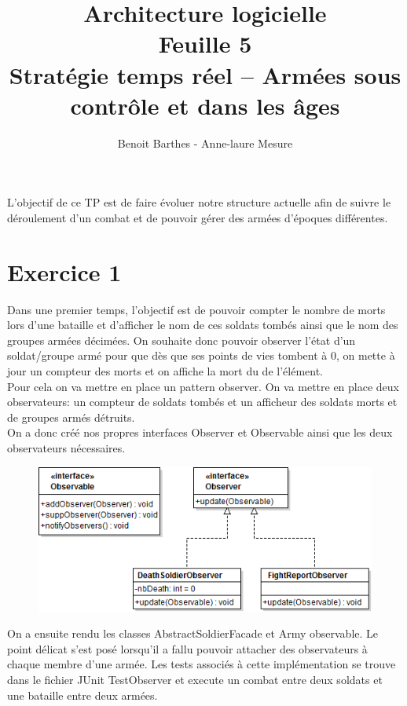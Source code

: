 \documentclass[%
a4paper,
11pt
]{article}
\begin{document}
\title{Architecture logicielle \\ Feuille 5 \\ Stratégie temps réel – Armées sous contrôle et dans les âges}
\author{Benoit Barthes - Anne-laure Mesure}
\maketitle

L'objectif de ce TP est de faire évoluer notre structure actuelle afin de suivre le déroulement d'un combat et de pouvoir gérer des armées d'époques différentes.

 \newpage
\section*{Exercice 1}

Dans une premier temps, l'objectif est de pouvoir compter le nombre de morts lors d'une bataille et d'afficher le nom de ces soldats tombés ainsi que le nom des groupes armées décimées. On souhaite donc pouvoir observer l'état d'un soldat/groupe armé pour que dès que ses points de vies tombent à 0, on mette à jour un compteur des morts et on affiche la mort du de l'élément.\\
Pour cela on va mettre en place un pattern observer. On va mettre en place deux observateurs: un compteur de soldats tombés et un afficheur des soldats morts et de groupes armés détruits.\\
On a donc créé nos propres interfaces Observer et Observable ainsi que les deux observateurs nécessaires.

\begin{figure}[!ht]
    \center
    \includegraphics[width =13cm]{imgs/observer.png}
\end{figure}

On a ensuite rendu les classes AbstractSoldierFacade et Army observable. Le point délicat s'est posé lorsqu'il a fallu pouvoir attacher des observateurs à chaque membre d'une armée. Les tests associés à cette implémentation se trouve dans le fichier JUnit TestObserver et execute un combat entre deux soldats et une bataille entre deux armées.
\end{document}
